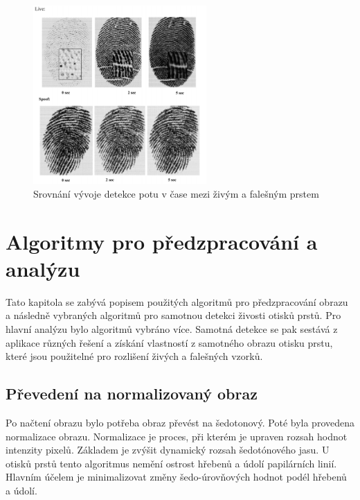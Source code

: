 \begin{figure}[!htbp]
    \centering
    \includegraphics[width=250px]{obrazky-figures/pores.png}
    \caption{Srovnání vývoje detekce potu v čase mezi živým a falešným prstem \cite{PoresResearch}}
\end{figure}




\chapter{Algoritmy pro předzpracování a analýzu}
Tato kapitola se zabývá popisem použitých algoritmů pro předzpracování obrazu a následně vybraných algoritmů pro samotnou detekci živosti otisků prstů. Pro hlavní analýzu bylo algoritmů vybráno více. Samotná detekce se pak sestává z aplikace různých řešení a získání vlastností z samotného obrazu otisku prstu, které jsou použitelné pro rozlišení živých a falešných vzorků.
\section{Převedení na normalizovaný obraz}
Po načtení obrazu bylo potřeba obraz převést na šedotonový. Poté byla provedena normalizace obrazu. Normalizace je proces, při kterém je upraven rozsah hodnot intenzity pixelů. Základem je zvýšit dynamický rozsah šedotónového jasu. U otisků prstů tento algoritmus nemění ostrost hřebenů a údolí papilárních linií. Hlavním účelem je minimalizovat změny šedo-úrovňových hodnot podél hřebenů a údolí. 

